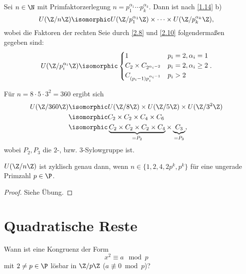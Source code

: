\begin{kor} \label{2.11}
	Sei $n \in \N$ mit Primfaktorzerlegung $n = p_1^{\alpha_1} \dotsb p_k^{\alpha_k}$.
	Dann ist nach \ref{1.14} b)
	\[
		U(\Z / n\Z) \isomorphic U(\Z / p_1^{\alpha_1}\Z) \times \dotsb \times U(\Z / p_k^{\alpha_k} \Z),
	\]
	wobei die Faktoren der rechten Seie durch \ref{2.8} und \ref{2.10} folgendermaßen gegeben sind:
	\[
		U(\Z / p_i^{\alpha_i} \Z)
		\isomorphic \begin{cases}
			1 & p_i = 2, \alpha_i = 1 \\
			C_2 \times C_{2^{\alpha_i - 2}} & p_i = 2, \alpha_i \ge 2 \\
			C_{(p_i-1)p_i^{\alpha_i - 1}} & p_i > 2
		\end{cases}.
	\]
\end{kor}

\begin{ex*}
	Für $n = 8 \cdot 5 \cdot 3^2 = 360$ ergibt sich
	\begin{align*}
		U(\Z / 360 \Z)
		&\isomorphic U(\Z / 8 \Z) \times U(\Z / 5 \Z) \times U(\Z / 3^2 \Z) \\
		&\isomorphic C_2 \times C_2 \times C_4 \times C_6 \\
		&\isomorphic \underbrace{C_2 \times C_2 \times C_2 \times  C_4}_{=P_2} \times \underbrace{C_3}_{=P_3},
	\end{align*}
	wobei $P_2, P_3$ die $2$-, bzw. $3$-Sylowgruppe ist.
\end{ex*}

\begin{kor} \label{2.12}
	$U(\Z / n\Z)$ ist zyklisch genau dann, wenn $n \in \{1, 2, 4, 2p^k, p^k \}$ für eine ungerade Primzahl $p \in \P$.
	\begin{proof}
		Siehe Übung.
		\Exercise
	\end{proof}
\end{kor}

\section{Quadratische Reste}

Wann ist eine Kongruenz der Form
\[
	x^2 \equiv a \mod p
\]
mit $2 \neq p \in \P$ lösbar in $\Z / p\Z$ ($a \not\equiv 0 \bmod p$)?

